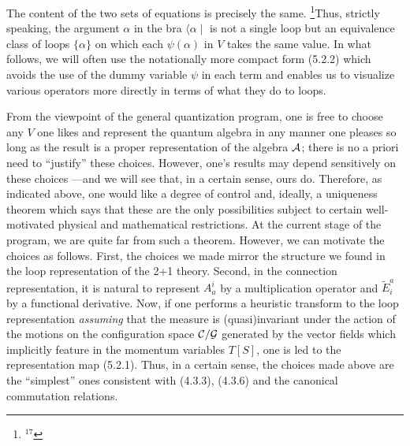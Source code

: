 The content of the two sets of equations is precisely the same.%
\footnote{$^{17}$}{Thus, strictly speaking, the argument $\alpha$ in the bra
$\langle \alpha\mid$ is not a single loop but an equivalence class of loops
$\{\alpha\}$ on which each $\psi(\alpha )$ in $V$ takes the same value.}
In what follows, we will often use the notationally more compact form (5.2.2)
which avoids the use of the dummy variable $\psi$ in each term and enables
us to visualize various operators more directly in terms of what they do to
loops.

{}From the viewpoint of the general quantization program, one is free to
choose any $V$ one likes and represent the quantum algebra in any manner
one pleases so long as the result is a proper representation of the algebra
${\cal A}$; there is no a priori need to ``justify'' these choices. However,
one's results may depend sensitively on these choices ---and we will see
that, in a certain sense, ours do. Therefore, as indicated above, one would
like a degree of control and, ideally, a uniqueness theorem which says that
these are the only possibilities subject to certain well-motivated physical
and mathematical restrictions. At the current stage of the program, we are
quite far from such a theorem. However, we can motivate the choices
as follows. First, the choices we made mirror the structure we found in
the loop representation of the 2+1 theory. Second, in the connection
representation, it is natural to represent $A_a^i$ by a multiplication
operator and $\tilde{E}^a_i$ by a functional derivative. Now, if one performs
a heuristic transform to the loop representation {\it assuming} that the
measure is (quasi)\-invariant under the action of the motions on the
configuration space ${\cal C}/{\cal G}$ generated by the vector fields which
implicitly feature in the momentum variables $T[S]$, one is led to the
representation map (5.2.1). Thus, in a certain sense, the choices made above
are the ``simplest'' ones consistent with (4.3.3), (4.3.6) and the canonical
commutation relations.

